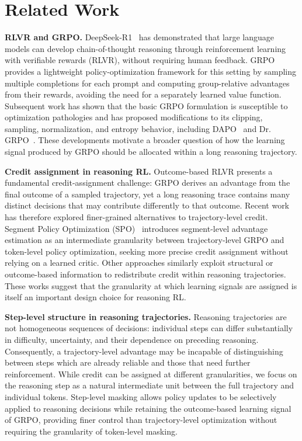 \documentclass{article}
\begin{document}
\section{Related Work}

\textbf{RLVR and GRPO.} DeepSeek-R1~\cite{Guo_2025} has demonstrated that large language models can develop chain-of-thought reasoning through reinforcement learning with verifiable rewards (RLVR), without requiring human feedback. GRPO~\cite{shao2024deepseekmath} provides a lightweight policy-optimization framework for this setting by sampling multiple completions for each prompt and computing group-relative advantages from their rewards, avoiding the need for a separately learned value function. Subsequent work has shown that the basic GRPO formulation is susceptible to optimization pathologies and has proposed modifications to its clipping, sampling, normalization, and entropy behavior, including DAPO~\cite{yu2025dapoopensourcellmreinforcement} and Dr. GRPO~\cite{liu2025understandingr1zeroliketrainingcritical}. These developments motivate a broader question of how the learning signal produced by GRPO should be allocated within a long reasoning trajectory.

\textbf{Credit assignment in reasoning RL.} Outcome-based RLVR presents a fundamental credit-assignment challenge: GRPO derives an advantage from the final outcome of a sampled trajectory, yet a long reasoning trace contains many distinct decisions that may contribute differently to that outcome. Recent work has therefore explored finer-grained alternatives to trajectory-level credit. Segment Policy Optimization (SPO)~\cite{guo2025segmentpolicyoptimizationeffective} introduces segment-level advantage estimation as an intermediate granularity between trajectory-level GRPO and token-level policy optimization, seeking more precise credit assignment without relying on a learned critic. Other approaches similarly exploit structural or outcome-based information to redistribute credit within reasoning trajectories. These works suggest that the granularity at which learning signals are assigned is itself an important design choice for reasoning RL.

\textbf{Step-level structure in reasoning trajectories.} Reasoning trajectories are not homogeneous sequences of decisions: individual steps can differ substantially in difficulty, uncertainty, and their dependence on preceding reasoning. Consequently, a trajectory-level advantage may be incapable of distinguishing between steps which are already reliable and those that need further reinforcement. While credit can be assigned at different granularities, we focus on the reasoning step as a natural intermediate unit between the full trajectory and individual tokens. Step-level masking allows policy updates to be selectively applied to reasoning decisions while retaining the outcome-based learning signal of GRPO, providing finer control than trajectory-level optimization without requiring the granularity of token-level masking.
\end{document}
